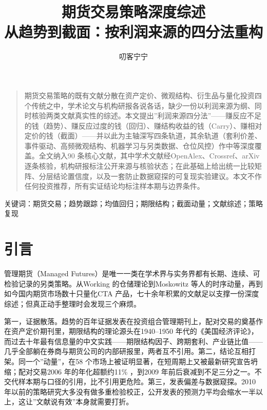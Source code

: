 \documentclass[12pt,a4paper]{ctexart}
\title{\heiti 期货交易策略深度综述\\[4pt]\Large 从趋势到截面：按利润来源的四分法重构}
\author{叨客宁宁}
\date{}
\begin{document}
\maketitle
\begin{center}\vspace{-7.2pt}{\small\bfseries 摘要}\vspace{-11.7pt}\end{center}
\begin{quotation}\small
期货交易策略的既有文献分散在资产定价、微观结构、衍生品与量化投资四个传统之中，学术论文与机构研报各说各话，缺少一份以利润来源为纲、同时核验两类文献真实性的综述。本文提出”\hspace{0.3em}利润来源四分法”——赚反应不足的钱（趋势）、赚反应过度的钱（回归）、赚结构收益的钱（Carry）、赚相对定价的钱（截面）——并以此为主轴深写四条轨道，其余轨道（套利价差、事件驱动、高频微观结构、机器学习与另类数据、仓位风控）作中等深度覆盖。全文纳入90 条核心文献，其中学术文献经OpenAlex、Crossref、arXiv 逐条核验，机构研报标注公开来源与核验状态；在此基础上给出统一比较矩阵、分层结论置信度，以及一套防止数据窥探的可复现实验建议。本文不作任何投资推荐，所有实证结论均标注样本期与边界条件。
\end{quotation}
\vspace{-6.2pt}\noindent 关键词：期货交易；趋势跟踪；均值回归；期限结构；截面动量；文献综述；策略复现
\vspace{-1.7pt}
\section{引言}

管理期货（Managed Futures）是唯一一类在学术界与实务界都有长期、连续、可检验记录的另类策略。从Working 的仓储理论到Moskowitz 等人的时序动量，再到如今国内期货市场数十只量化CTA 产品，七十余年积累的文献足以支撑一份深度综述；但真正动手整理时会发现三个麻烦。


第一，证据散落。趋势的百年证据发表在投资组合管理期刊上，配对交易的奠基作在资产定价期刊里，期限结构的理论源头在1940–1950 年代的《美国经济评论》，而过去十年最有信息量的中文实践——期限结构因子、跨期套利、产业链比值——几乎全部躺在券商与期货公司的内部研报里，两者互不引用。第二，结论互相打架。同一个”\hspace{0.3em}动量”，在58 个市场上被证明显著\cite{03}，在短周期上又被最新研究宣告坍缩\cite{11}；配对交易2006 年的年化超额约11\% \cite{28}，到2009 年前后衰减到不足三分之一\cite{35}。不交代样本期与口径的引用，比不引用更危险。第三，发表偏差与数据窥探。2010 年以前的策略研究大多没有做多重检验校正\cite{45, 46}，公开发表的预测力平均会缩水一半以上\cite{36}，这让”\hspace{0.3em}文献说有效”\hspace{0.3em}本身就需要打折。
\end{document}
